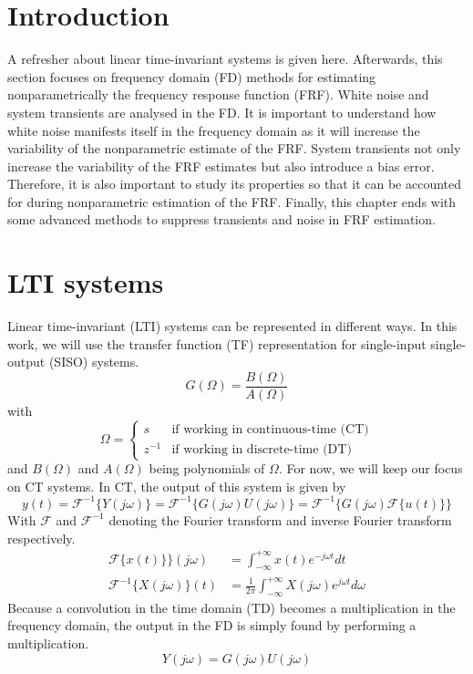 \section{Introduction}
A refresher about linear time-invariant systems is given here. Afterwards, this section focuses on frequency domain (FD) methods for estimating nonparametrically the frequency response function (FRF). White noise and system transients are analysed in the FD. It is important to understand how white noise manifests itself in the frequency domain as it will increase the variability of the nonparametric estimate of the FRF. System transients not only increase the variability of the FRF estimates but also introduce a bias error. Therefore, it is also important to study its properties so that it can be accounted for during nonparametric estimation of the FRF. Finally, this chapter ends with some advanced methods to suppress transients and noise in FRF estimation.


\section{LTI systems}
Linear time-invariant (LTI) systems can be represented in different ways. In this work, we will use the transfer function (TF) representation for single-input single-output (SISO) systems.
\begin{equation*}
    G(\Omega) = \frac{B(\Omega)}{A(\Omega)}
\end{equation*}
with
\begin{equation*}
    \Omega = \begin{cases}
        s & \text{if working in continuous-time (CT)} \\
        z^{-1} & \text{if working in discrete-time (DT)} 
    \end{cases}
\end{equation*}
and $B(\Omega)$ and $A(\Omega)$ being polynomials of $\Omega$. 
For now, we will keep our focus on CT systems. In CT, the output of this system is given by
\begin{equation*}
    y(t) = \mathcal{F}^{-1}\{Y(j\omega)\} = \mathcal{F}^{-1}\{G(j\omega) U(j\omega)\} = \mathcal{F}^{-1}\{G(j\omega) \mathcal{F}\{u(t)\}\}
\end{equation*}
With $\mathcal{F}$ and $\mathcal{F}^{-1}$ denoting the Fourier transform and inverse Fourier transform respectively.
\begin{align*}
    \mathcal{F}\{x(t)\}\}(j\omega) &= \int_{-\infty}^{+\infty} x(t) e^{-j \omega t} dt \\
    \mathcal{F}^{-1}\{X(j\omega)\}(t) &= \frac{1}{2\pi} \int_{-\infty}^{+\infty} X(j\omega) e^{j \omega t} d \omega 
\end{align*}
Because a convolution in the time domain (TD) becomes a multiplication in the frequency domain, the output in the FD is simply found by performing a multiplication.
\begin{equation}
\boxed{
    Y(j\omega) =G(j\omega) U(j\omega)
    }
    \label{eq:Y=GU}
\end{equation}

